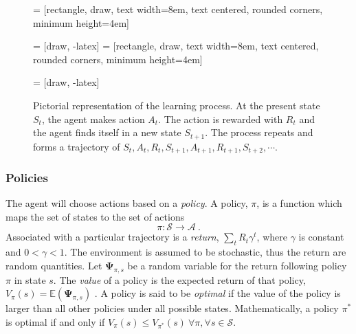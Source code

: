 \begin{figure}[h!]
\centering
	
 = [rectangle, draw, 
text width=8em, text centered, rounded corners, minimum height=4em]

 = [draw, -latex]
 = [rectangle, draw, 
text width=8em, text centered, rounded corners, minimum height=4em]

 = [draw, -latex]


\caption[Reinforcement learning process]{Pictorial representation of the learning process.  At the present state $ S_t $, the agent makes action $ A_t $.  The action is rewarded with $ R_t $ and the agent finds itself in a new state $ S_{t+1} $.  The process repeats and forms a trajectory of $ {S_t,A_t,R_t,S_{t+1}, A_{t+1}, R_{t+1}, S_{t+2}, \cdots} $.  }
\label{RL_diagram}
\end{figure}


\subsubsection{Policies}

The agent will choose actions based on a \textit{policy}.  A policy, $ \pi $, is a function which maps the set of states to the set of actions  
%
\begin{equation}\label{key}
\pi : \mathcal{S} \rightarrow \mathcal{A}\>.
\end{equation}
%
Associated with a particular trajectory is a \textit{return}, $ \sum_t R_t \gamma^t $, where $ \gamma $ is constant and $ 0 < \gamma < 1 $.  The environment is assumed to be stochastic, thus the return are random quantities. Let $ \mathbf{\Psi}_{\pi,s} $ be a random variable for the return following policy $ \pi $ in state $ s $.  The \textit{value} of a policy is the expected return of that policy, $V_{\pi}(s) =  \mathbb{E}(\mathbf{\Psi}_{\pi,s}) $ \cite{lizotte2017reinforcement}.  A policy is said to be \textit{optimal} if the value of the policy is larger than all other policies under all possible states.  Mathematically, a policy $ \pi^* $ is optimal if and only if $ V_{\pi}(s)  \leq V_{\pi^*}(s) \> \forall \pi, \forall s\in \mathcal{S}  $.



